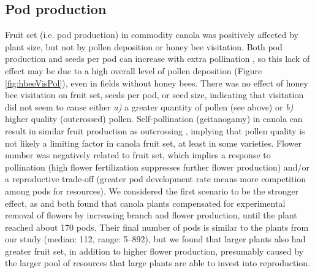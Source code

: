 \documentclass[12pt, draft]{article} %
\begin{document}
\subsection{Pod production} %
Fruit set (i.e. pod production) in commodity canola was positively affected by plant size, but not by pollen deposition or honey bee visitation.
Both pod production and seeds per pod can increase with extra pollination \citep{jauker2008,sabbahi2005,sabbahi2006,duran2010}, so this lack of effect may be due to a high overall level of pollen deposition (Figure \ref{fig:hbeeVisPol}), even in fields without honey bees.
There was no effect of honey bee visitation on fruit set, seeds per pod, or seed size, indicating that visitation did not seem to cause either \textit{a)} a greater quantity of pollen (see above) or \textit{b)} higher quality (outcrossed) pollen.
Self-pollination (geitanogamy) in canola can result in similar fruit production as outcrossing \citep{rosa2011}, implying that pollen quality is not likely a limiting factor in canola fruit set, at least in some varieties.
Flower number was negatively related to fruit set, which implies a response to pollination (high flower fertilization suppresses further flower production) and/or a reproductive trade-off (greater pod development rate means more competition among pods for resources).
We considered the first scenario to be the stronger effect, as \citet{sabbahi2006} and \citet{mesquida1981} both found that canola plants compensated for experimental removal of flowers by increasing branch and flower production, until the plant reached about 170 pods.
Their final number of pods is similar to the plants from our study (median: 112, range: 5--892), but we found that larger plants also had greater fruit set, in addition to higher flower production, presumably caused by the larger pool of resources that large plants are able to invest into reproduction. 
\end{document}
